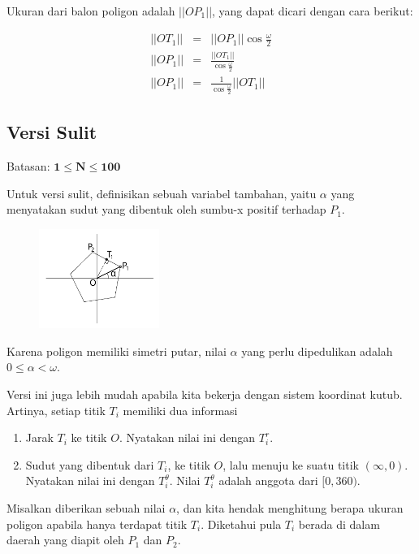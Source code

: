 \documentclass[../main_editorial.tex]{subfiles} %
\begin{document}
Ukuran dari balon poligon adalah $||OP_1||$, yang dapat dicari dengan cara berikut:

\begin{eqnarray*}
||OT_1|| &=& ||OP_1|| \cos{\frac{\omega}{2}} \\
||OP_1|| &=& \frac{||OT_1||}{\cos{\frac{\omega}{2}}} \\
||OP_1|| &=& \frac{1}{\cos{\frac{\omega}{2}}} ||OT_1||
\end{eqnarray*}

\subsection*{Versi Sulit}

Batasan: $\mathbf{1 \le N \le 100}$

Untuk versi sulit, definisikan sebuah variabel tambahan, yaitu $\alpha$ yang menyatakan sudut yang dibentuk oleh sumbu-x positif terhadap $P_1$.

\begin{figure}[H]\centering
	\includegraphics[width=0.35\textwidth]{balon/asset/hard-intro.pdf}
\end{figure}

Karena poligon memiliki simetri putar, nilai $\alpha$ yang perlu dipedulikan adalah $0 \le \alpha < \omega$. 

Versi ini juga lebih mudah apabila kita bekerja dengan sistem koordinat kutub. Artinya, setiap titik $T_i$ memiliki dua informasi

\begin{enumerate}
  \item Jarak $T_i$ ke titik $O$. Nyatakan nilai ini dengan $T_i^r$.
  \item Sudut yang dibentuk dari $T_i$, ke titik $O$, lalu menuju ke suatu titik $(\infty, 0)$. Nyatakan nilai ini dengan $T_i^\theta$. Nilai $T_i^\theta$ adalah anggota dari $[0, 360)$.
\end{enumerate}

Misalkan diberikan sebuah nilai $\alpha$, dan kita hendak menghitung berapa ukuran poligon apabila hanya terdapat titik $T_i$. Diketahui pula $T_i$ berada di dalam daerah yang diapit oleh $P_1$ dan $P_2$. 
\end{document}
